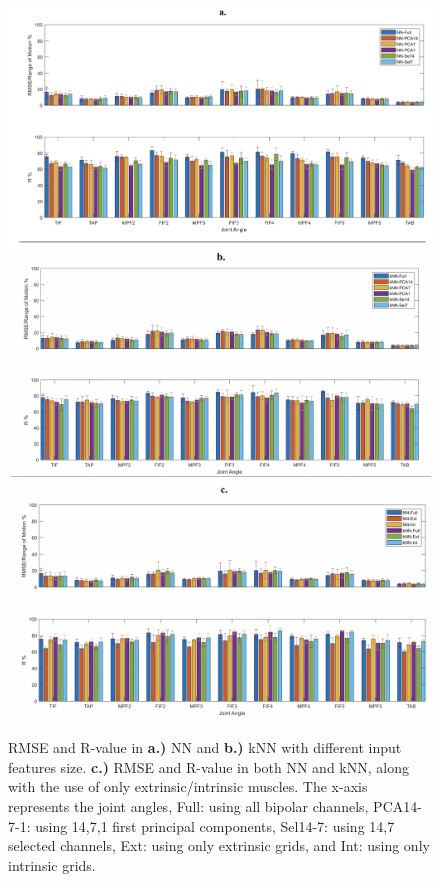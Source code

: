 \documentclass[conference]{IEEEtran}
\begin{document}
\begin{figure}
    \centering
    \includegraphics[width=\columnwidth]{figure7.png}
    \includegraphics[width=\columnwidth]{figure8.png}
    \includegraphics[width=\columnwidth]{figure9.png}
    \caption{RMSE and R-value in \textbf{a.)} NN and \textbf{b.)} kNN with different input features size. \textbf{c.)} RMSE and R-value in both NN and kNN, along with the use of only extrinsic/intrinsic muscles. The x-axis represents 
the joint angles, Full: using all bipolar channels, PCA14-7-1: using 14,7,1 first principal components, 
Sel14-7: using 14,7 selected channels, Ext: using only extrinsic grids, and Int: using only intrinsic grids.
}
    \label{figure7}
\end{figure}
\end{document}
